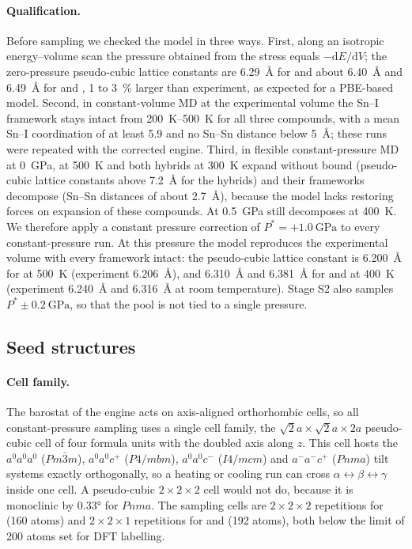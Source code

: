 \paragraph{Qualification.} Before sampling we checked the model in three ways. First, along an
isotropic energy--volume scan the pressure obtained from the stress equals $-\mathrm{d}E/\mathrm{d}V$;
the zero-pressure pseudo-cubic lattice constants are \SI{6.29}{\angstrom} for \CsSnI{} and about
\SI{6.40}{\angstrom} and \SI{6.49}{\angstrom} for \MASnI{} and \FASnI{}, 1 to \SI{3}{\percent}
larger than experiment, as expected for a PBE-based model. Second, in constant-volume MD at the
experimental volume the Sn--I framework stays intact from \SIrange{200}{500}{\kelvin} for all three
compounds, with a mean Sn--I coordination of at least 5.9 and no Sn--Sn distance below
\SI{5}{\angstrom}; these runs were repeated with the corrected engine. Third, in flexible
constant-pressure MD at \SI{0}{\giga\pascal}, \CsSnI{} at \SI{500}{\kelvin} and both hybrids at
\SI{300}{\kelvin} expand without bound (pseudo-cubic lattice constants above \SI{7.2}{\angstrom}
for the hybrids) and their frameworks decompose (Sn--Sn distances of about \SI{2.7}{\angstrom}),
because the model lacks restoring forces on expansion of these compounds. At \SI{0.5}{\giga\pascal}
\MASnI{} still decomposes at \SI{400}{\kelvin}. We therefore apply a constant pressure correction of
$P^\ast=+\SI{1.0}{\giga\pascal}$ to every constant-pressure run. At this pressure the model reproduces
the experimental volume with every framework intact: the pseudo-cubic lattice constant is
\SI{6.200}{\angstrom} for \CsSnI{} at \SI{500}{\kelvin} (experiment \SI{6.206}{\angstrom}), and
\SI{6.310}{\angstrom} and \SI{6.381}{\angstrom} for \MASnI{} and \FASnI{} at \SI{400}{\kelvin}
(experiment \SI{6.240}{\angstrom} and \SI{6.316}{\angstrom} at room temperature). Stage S2 also
samples $P^\ast\pm\SI{0.2}{\giga\pascal}$, so that the pool is not tied to a single pressure.

\subsection{Seed structures}
\label{sec:configgen:seeds}

\paragraph{Cell family.} The barostat of the engine acts on axis-aligned orthorhombic cells, so all
constant-pressure sampling uses a single cell family, the $\sqrt{2}a\times\sqrt{2}a\times2a$
pseudo-cubic cell of four formula units with the doubled axis along $z$. This cell hosts the
$a^0a^0a^0$ ($Pm\bar{3}m$), $a^0a^0c^+$ ($P4/mbm$), $a^0a^0c^-$ ($I4/mcm$) and $a^-a^-c^+$ ($Pnma$)
tilt systems exactly orthogonally, so a heating or cooling run can cross
$\alpha\leftrightarrow\beta\leftrightarrow\gamma$ inside one cell. A pseudo-cubic
$2\times2\times2$ cell would not do, because it is monoclinic by \ang{0.33} for $Pnma$. The sampling
cells are $2\times2\times2$ repetitions for \CsSnI{} (160 atoms) and $2\times2\times1$ repetitions for
\MASnI{} and \FASnI{} (192 atoms), both below the limit of 200 atoms set for DFT labelling.

